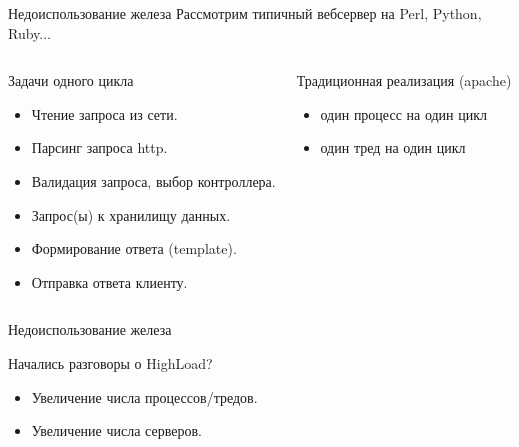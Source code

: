 \documentclass[aspectratio=169]{beamer}
\begin{document}
\begin{frame}{Недоиспользование железа}
    Рассмотрим типичный вебсервер на Perl, Python, Ruby...
    \pause

    \begin{columns}
        \begin{block}{Задачи одного цикла}
            \begin{itemize}
                \item Чтение запроса из сети.
                \item Парсинг запроса http.
                \item Валидация запроса, выбор контроллера.
                \item Запрос(ы) к хранилищу данных.
                \item Формирование ответа (template).
                \item Отправка ответа клиенту.
            \end{itemize}
        \end{block}

        \pause
        \begin{block}{Традиционная реализация (apache)}
            \begin{itemize}
                \item один процесс на один цикл
                \item один тред на один цикл
            \end{itemize}

        \end{block}
    \end{columns}
\end{frame}


\begin{frame}{Недоиспользование железа}
    \begin{block}{Начались разговоры о HighLoad?}
        \begin{itemize}
            \item Увеличение числа процессов/тредов.
            \item Увеличение числа серверов.
        \end{itemize}
    \end{block}
\end{frame}
\end{document}
